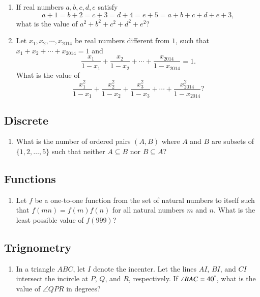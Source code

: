 \documentclass[12pt,letter paper]{article}
\providecommand{\brak}[1]{\ensuremath{\left(#1\right)}}
\begin{document}
\begin{enumerate}
\item If real numbers $a, b, c, d, e$ satisfy
    \[
        a + 1 = b + 2 = c + 3 = d + 4 = e + 5 = a + b + c + d + e + 3,
    \]
    what is the value of $a^2 + b^2 + c^2 + d^2 + e^2$?
    \item Let $x_1, x_2, \cdots, x_{2014}$ be real numbers different from $1$, such that$x_1 + x_2 + \cdots + x_{2014} = 1$ and
    \[
        \frac{x_1}{1 - x_1} + \frac{x_2}{1 - x_2} + \cdots + \frac{x_{2014}}{1 - x_{2014}} = 1.
    \]
    What is the value of
    \[
        \frac{x_1^2}{1 - x_1} + \frac{x_2^2}{1 - x_2} + \frac{x_3^2}{1 - x_3} + \cdots + \frac{x_{2014}^2}{1 - x_{2014}}?
    \]
\end{enumerate}
\begin{center}
	\section*{Discrete}
\end{center}
\begin{enumerate}
	\item What is the number of ordered pairs $\brak{A, B}$ where $A$ and $B$ are subsets of $\{1, 2, \ldots, 5\}$ such that neither $A \subseteq B$ nor $B \subseteq A$?
\end{enumerate}
\begin{center}
	\section*{Functions}
\end{center}
\begin{enumerate}
	\item Let $f$ be a one-to-one function from the set of natural numbers to itself such that $f\brak{mn} = f\brak{m} f\brak{n}$ for all natural numbers $m$ and $n$. What is the least possible value of $f\brak{999}$?
\end{enumerate}
\begin{center}
	\section*{Trignometry}
\end{center}
\begin{enumerate}
\item In a triangle $ABC$, let $I$ denote the incenter. Let the lines $AI$, $BI$, and $CI$ intersect the incircle at $P$, $Q$, and $R$, respectively. If $\angle BAC = 40^\degree$, what is the value of $\angle QPR$ in degrees?
\end{enumerate}
\end{document}
